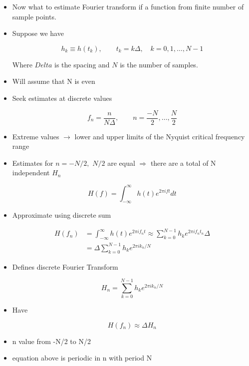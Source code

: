 \begin{itemize}
    \item Now what to estimate Fourier transform if a function from finite number of sample points.
    \item Suppose we have

    \[ h_k \equiv h(t_k), \qquad t_k = k\Delta, \quad k=0,1,\ldots, N-1\]

    Where $Delta$ is the spacing and $N$ is the number of samples.

    \item Will assume that N is even

    \item Seek estimates at discrete values

    \[ f_n = \frac{n}{N\Delta}, \qquad n = \frac{-N}{2}, \ldots , \frac{N}{2}\]

    \item Extreme values $\rightarrow$ lower and upper limits of the Nyquist critical frequency range

    \item Estimates for $n=-N/2,$ $N/2$ are equal $\Rightarrow$ there are a total of N independent $H_n$

    \[ H(f) = \int_{-\infty}^{\infty} h(t) e^{2\pi i f t} dt\]

    \item Approximate using discrete sum

    \begin{align}
        H(f_n) &= \int_{-\infty}^{\infty} h(t) e^{2 \pi i f_n t} \approx \sum_{k=0}^{N-1} h_k e^{2\pi i f_n t_n} \Delta \\
        &= \Delta \sum_{k=0}^{N-1} h_k e^{2\pi i k_n/N} 
    \end{align}

    \item Defines discrete Fourier Transform

    \begin{equation}
        H_n = \sum_{k=0}^{N-1} h_k e^{2\pi i k_n/N} 
    \end{equation}

    \item Have 

    \[ H(f_n) \approx \Delta H_n\]

    \item n value from -N/2 to N/2

    \item equation above is periodic in n with period N


\end{itemize}
